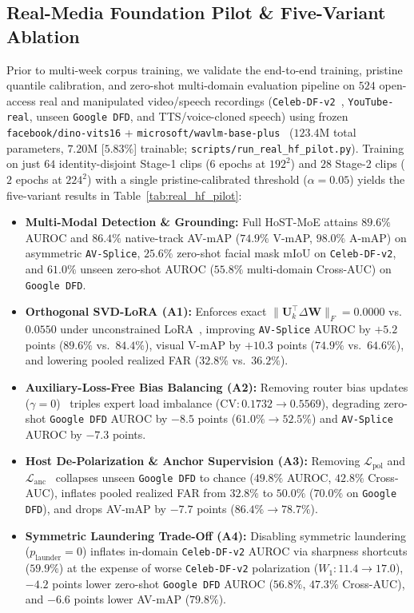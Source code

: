 \documentclass[10pt,twocolumn]{article}
\begin{document}


\subsection{Real-Media Foundation Pilot \& Five-Variant Ablation}
\label{subsec:real_pilot}
Prior to multi-week corpus training, we validate the end-to-end training, pristine quantile calibration, and zero-shot multi-domain evaluation pipeline on $524$ open-access real and manipulated video/speech recordings (\texttt{Celeb-DF-v2}~\cite{li2020celeb}, \texttt{YouTube-real}, unseen \texttt{Google DFD}, and TTS/voice-cloned speech) using frozen \texttt{facebook/dino-vits16} + \texttt{microsoft/wavlm-base-plus}~\cite{chen2022wavlm} ($123.4$M total parameters, $7.20$M [$5.83\%$] trainable; \texttt{scripts/run\_real\_hf\_pilot.py}). Training on just $64$ identity-disjoint Stage-1 clips ($6$ epochs at $192^2$) and $28$ Stage-2 clips ($2$ epochs at $224^2$) with a single pristine-calibrated threshold ($\alpha=0.05$) yields the five-variant results in Table~\ref{tab:real_hf_pilot}:
\begin{itemize}[leftmargin=*,nosep]
    \item \textbf{Multi-Modal Detection \& Grounding:} Full HoST-MoE attains $\mathbf{89.6\%}$ AUROC and $\mathbf{86.4\%}$ native-track AV-mAP ($74.9\%$ V-mAP, $98.0\%$ A-mAP) on asymmetric \texttt{AV-Splice}, $25.6\%$ zero-shot facial mask mIoU on \texttt{Celeb-DF-v2}, and $\mathbf{61.0\%}$ unseen zero-shot AUROC ($55.8\%$ multi-domain Cross-AUC) on \texttt{Google DFD}.
    \item \textbf{Orthogonal SVD-LoRA (A1):} Enforces exact $\|\mathbf{U}_k^\top\Delta\mathbf{W}\|_F = 0.0000$ vs.\ $0.0550$ under unconstrained LoRA~\cite{yan2025effort}, improving \texttt{AV-Splice} AUROC by $+5.2$ points ($89.6\%$ vs.\ $84.4\%$), visual V-mAP by $+10.3$ points ($74.9\%$ vs.\ $64.6\%$), and lowering pooled realized FAR ($32.8\%$ vs.\ $36.2\%$).
    \item \textbf{Auxiliary-Loss-Free Bias Balancing (A2):} Removing router bias updates ($\gamma=0$)~\cite{deepseek2024v3} triples expert load imbalance ($\text{CV}: 0.1732 \to 0.5569$), degrading zero-shot \texttt{Google DFD} AUROC by $-8.5$ points ($61.0\% \to 52.5\%$) and \texttt{AV-Splice} AUROC by $-7.3$ points.
    \item \textbf{Host De-Polarization \& Anchor Supervision (A3):} Removing $\mathcal{L}_{\text{pol}}$ and $\mathcal{L}_{\text{anc}}$~\cite{nguyen2026whenaucmisleads} collapses unseen \texttt{Google DFD} to chance ($49.8\%$ AUROC, $42.8\%$ Cross-AUC), inflates pooled realized FAR from $32.8\%$ to $50.0\%$ ($70.0\%$ on \texttt{Google DFD}), and drops AV-mAP by $-7.7$ points ($86.4\% \to 78.7\%$).
    \item \textbf{Symmetric Laundering Trade-Off (A4):} Disabling symmetric laundering ($p_{\text{launder}}=0$) inflates in-domain \texttt{Celeb-DF-v2} AUROC via sharpness shortcuts ($59.9\%$) at the expense of worse \texttt{Celeb-DF-v2} polarization ($W_1: 11.4 \to 17.0$), $-4.2$ points lower zero-shot \texttt{Google DFD} AUROC ($56.8\%$, $47.3\%$ Cross-AUC), and $-6.6$ points lower AV-mAP ($79.8\%$).
\end{itemize}
\end{document}
